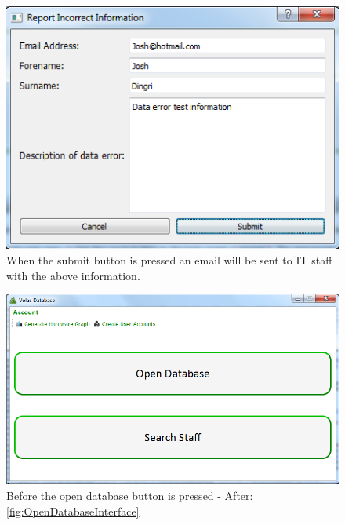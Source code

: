 \begin{figure}[H]
    \includegraphics[width=\textwidth]{./Testing/Images/SubmitErrorReport}
    \caption{When the submit button is pressed an email will be sent to IT staff with the above information.} \label{fig:SubmitErrorReport}
\end{figure}

\begin{figure}[H]
    \includegraphics[width=\textwidth]{./Testing/Images/AdminInterface.png}
    \caption{Before the open database button is pressed - After: \ref{fig:OpenDatabaseInterface}} \label{fig:OpenDatabaseInterfaceBF}
\end{figure}


